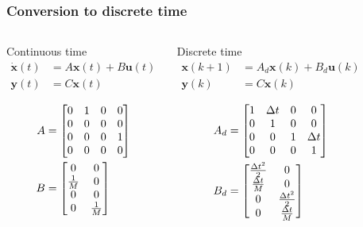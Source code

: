 \begin{frame} 
	\frametitle{Conversion to discrete time}
	\begin{columns}[onlytextwidth]
		\begin{block}{Continuous time}
			\begin{align*}
			\dot{\bm{x}}(t) &= A \bm{x}(t) + B \bm{u}(t)\\
			\bm{y}(t) &= C \bm{x}(t) 
			\end{align*}
			
			\begin{align*}
			A&=
			\begin{bmatrix}0&1&0&0\\0&0&0&0\\0&0&0&1\\0&0&0&0\end{bmatrix}
			\\
			B&=\begin{bmatrix}0&0\\ \frac{1}{M} &0\\0&0 \\0&\frac{1}{M}\end{bmatrix}
			\end{align*}
		\end{block}
		\centering
		\begin{block}{Discrete time}
			\begin{align*}
			\bm{x}(k+1) &= A_d \bm{x}(k) + B_d \bm{u}(k)\\
			\bm{y}(k) &= C \bm{x}(k) 
			\end{align*}
			
			\begin{align*}
			A_d&=\begin{bmatrix}1&\Delta t&0&0\\0&1&0&0\\0&0&1&\Delta t\\0&0&0&1\end{bmatrix}
			\\
			B_d&=\begin{bmatrix}\frac{\Delta t^2}{2}&0\\ \frac{\Delta t}{M} &0\\0&\frac{\Delta t^2}{2} \\0&\frac{\Delta t}{M}\end{bmatrix}
			\end{align*}
		\end{block}
	\end{columns}
\end{frame}

